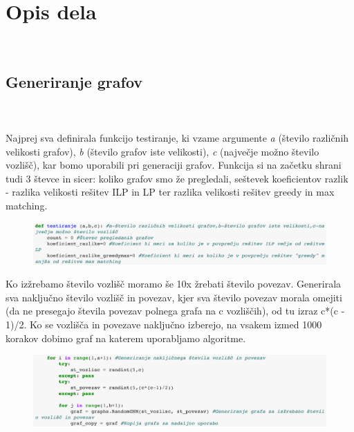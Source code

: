 \documentclass[12pt,a4paper]{amsart}
\theoremstyle{definition} %
\theoremstyle{plain} %
\begin{document}

\newpage

\section{Opis dela}
\

\subsection{Generiranje grafov}
\
\\
\\
Najprej sva definirala funkcijo testiranje, ki vzame argumente \textit{a} (število različnih velikosti grafov), \textit{b} (število grafov iste velikosti), \textit{c} (največje možno število vozlišč), kar bomo uporabili pri generaciji grafov. Funkcija si na začetku shrani tudi 3 števce in sicer: koliko grafov smo že pregledali, seštevek koeficientov razlik - razlika velikosti rešitev ILP in LP ter razlika velikosti rešitev greedy in max matching. 




\begin{figure}[ht]
\centering
\includegraphics[width=1\textwidth]{Screen2.png}
\end{figure}

Ko izžrebamo število vozlišč moramo še 10x žrebati število povezav. Generirala sva naključno število vozlišč in povezav, kjer sva število povezav morala omejiti (da ne presegajo števila povezav polnega grafa na c vozliščih), od tu izraz c*(c - 1)/2. Ko se vozlišča in povezave naključno izberejo, na vsakem izmed 1000 korakov dobimo graf na katerem uporabljamo algoritme.



\begin{figure}[ht]
\centering
\includegraphics[width=1\textwidth]{Screen3.png}
\end{figure}
\end{document}
